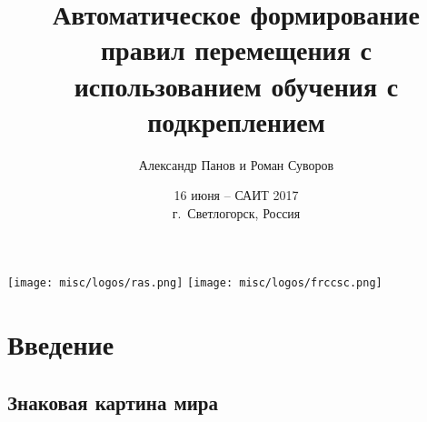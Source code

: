 \documentclass[default]{beamer}
\begin{document}
	
	\title[Обучение перемещению]{Автоматическое формирование правил перемещения с использованием обучения с подкреплением}
	\author[Панов и Суворов]{Александр Панов и Роман Суворов}
	\date[16 июня -- САИТ 2017]{16 июня -- САИТ 2017\\г.~Светлогорск, Россия} 
		
	\begin{frame}
		\titlepage
		\centering
		\texttt{[image: misc/logos/ras.png]} \hspace{10pt}
		\texttt{[image: misc/logos/frccsc.png]}
	\end{frame}

	\section{Введение}
	\subsection{Знаковая картина мира}
\end{document}
